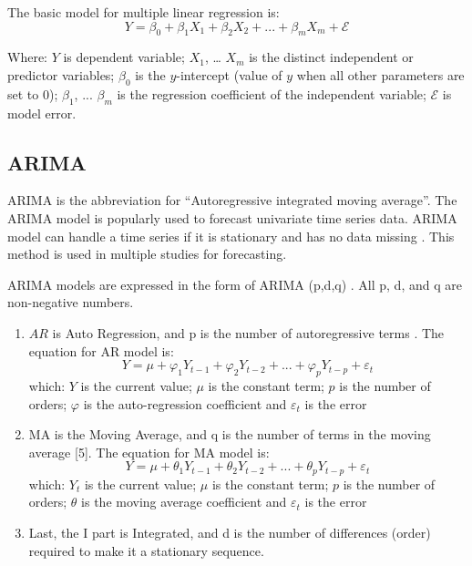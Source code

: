 \documentclass{ieeeojies}
\begin{document}
The basic model for multiple linear regression is:
\begin{equation}
Y = \beta_0 + \beta_1X_1 + \beta_2X_2 + ... + \beta_mX_m + \mathcal{E}
\end{equation}

Where: $Y$ is dependent variable; $X_1$, … $X_m$ is the distinct independent or predictor variables; $\beta_0$ is the $y$-intercept (value of $y$ when all other parameters are set to 0); $\beta_1$, ... $\beta_m$ is the regression coefficient of the independent variable; $\mathcal{E}$ is model error. 

\subsection{ARIMA}
ARIMA is the abbreviation for “Autoregressive integrated moving average”. The ARIMA model is popularly used to forecast univariate time series data. ARIMA model can handle a time series if it is stationary and has no data missing \cite{b6}. This method is used in multiple studies for forecasting. 

ARIMA models are expressed in the form of ARIMA (p,d,q) \cite{b7}. All p, d, and q are non-negative numbers. 

\begin{enumerate}
    \item$AR$ is Auto Regression, and p is the number of autoregressive terms \cite{b8}. The equation for AR model is:
    \begin{equation}
        Y = \mu + \varphi_1Y_{t-1} + \varphi_2Y_{t-2} + ... + \varphi_pY_{t-p} + \varepsilon_t
    \end{equation}
which: $Y$ is the current value; $\mu$ is the constant term; $p$ is the number of orders; $\varphi$ is the auto-regression coefficient and $\varepsilon_t$ is the error 
    \item MA is the Moving Average, and q is the number of terms in the moving average [5]. The equation for MA model is:
    \begin{equation}
        Y = \mu + \theta_1Y_{t-1} + \theta_2Y_{t-2} + ... + \theta_pY_{t-p} + \varepsilon_t
    \end{equation}
which: $Y_t$ is the current value; $\mu$ is the constant term; $p$ is the number of orders; $\theta$ is the moving average coefficient and $\varepsilon_t$ is the error 
    \item Last, the I part is Integrated, and d is the number of differences (order) required to make it a stationary sequence.
\end{enumerate}
\end{document}
